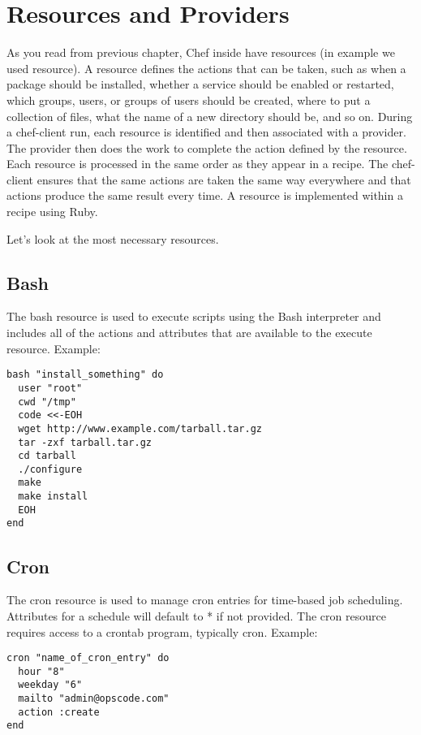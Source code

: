 \section{Resources and Providers}
\label{sec:cookbook-resources}

As you read from previous chapter, Chef inside have resources (in example we used  resource). A resource defines the actions that can be taken, such as when a package should be installed, whether a service should be enabled or restarted, which groups, users, or groups of users should be created, where to put a collection of files, what the name of a new directory should be, and so on. During a chef-client run, each resource is identified and then associated with a provider. The provider then does the work to complete the action defined by the resource. Each resource is processed in the same order as they appear in a recipe. The chef-client ensures that the same actions are taken the same way everywhere and that actions produce the same result every time. A resource is implemented within a recipe using Ruby.

Let's look at the most necessary resources.

\subsection{Bash}

The bash resource is used to execute scripts using the Bash interpreter and includes all of the actions and attributes that are available to the execute resource. Example:

\begin{lstlisting}[label=lst:cookbook-resources-bash]
bash "install_something" do
  user "root"
  cwd "/tmp"
  code <<-EOH
  wget http://www.example.com/tarball.tar.gz
  tar -zxf tarball.tar.gz
  cd tarball
  ./configure
  make
  make install
  EOH
end
\end{lstlisting}

\subsection{Cron}

The cron resource is used to manage cron entries for time-based job scheduling. Attributes for a schedule will default to * if not provided. The cron resource requires access to a crontab program, typically cron. Example:

\begin{lstlisting}[label=lst:cookbook-resources-cron1]
cron "name_of_cron_entry" do
  hour "8"
  weekday "6"
  mailto "admin@opscode.com"
  action :create
end
\end{lstlisting}

